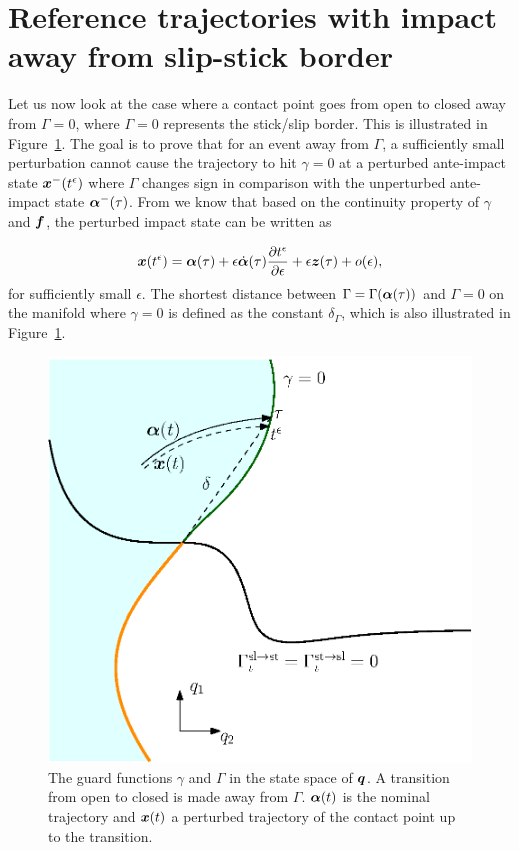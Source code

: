 \documentclass[../DC2017114Bouma.tex]{subfiles}
\begin{document}
\section{Reference trajectories with impact away from slip-stick border}\label{app:impactsaway}
Let us now look at the case where a contact point goes from open to closed away from $\Gamma = 0$, where $\Gamma = 0$ represents the stick/slip border. This is illustrated in Figure~\ref{fig:impactfromborder}. The goal is to prove that for an event away from $\Gamma$, a sufficiently small perturbation cannot cause the trajectory to hit $\gamma = 0$ at a perturbed ante-impact state ${\boldsymbol{x}}^-(t^\epsilon)$ where $\Gamma$ changes sign in comparison with the unperturbed ante-impact state $\boldsymbol{\alpha}^-(\tau)$. From \cite[p. 6]{Rijnen2018} we know that based on the continuity property of $\gamma$ and ${\boldsymbol{f}}$, the perturbed impact state can be written as

\begin{align}
{\boldsymbol{x}}(t^\epsilon) = \boldsymbol{\alpha}(\tau) + \epsilon\dot{\boldsymbol{\alpha}}(\tau)\frac{\partial t^\epsilon}{\partial \epsilon} + \epsilon{\boldsymbol{z}}(\tau) + o(\epsilon),\label{eq:appxpert}
\end{align}
for sufficiently small $\epsilon$. The shortest distance between $\Gamma = \Gamma(\boldsymbol{\alpha}(\tau))$ and $\Gamma = 0$ on the manifold where $\gamma = 0$ is defined as the constant $\delta_{\Gamma}$, which is also illustrated in Figure~\ref{fig:impactfromborder}.

\begin{figure}[h]
\centering
\includegraphics[width=.5\textwidth,trim={0cm 2.5cm 2cm 2.4cm},clip]{impactfromborder.eps}\caption{The guard functions $\gamma$ and $\Gamma$ in the state space of ${\boldsymbol{q}}$. A transition from open to closed is made away from $\Gamma$. $\boldsymbol{\alpha}(t)$ is the nominal trajectory and ${\boldsymbol{x}}(t)$ a perturbed trajectory of the contact point up to the transition.} \label{fig:impactfromborder}
\end{figure}
\end{document}

